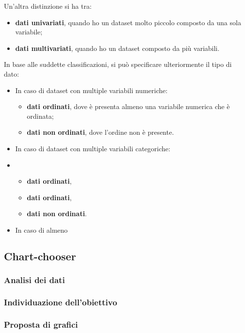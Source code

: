 \bigskip
\noindent Un'altra distinzione si ha tra:
\begin{itemize}
    \item \textbf{dati univariati}, quando ho un dataset molto piccolo composto da una sola variabile;
    \item \textbf{dati multivariati}, quando ho un dataset composto da più variabili.
\end{itemize}

\bigskip
\noindent In base alle suddette classificazioni, si può specificare ulteriormente il tipo di dato:
\begin{itemize}
    \item In caso di dataset con multiple variabili numeriche:
    \begin{itemize}
        \item \textbf{dati ordinati}, dove è presenta almeno una variabile numerica che è ordinata;
        \item \textbf{dati non ordinati}, dove l'ordine non è presente.
    \end{itemize}
    \item In caso di dataset con multiple variabili categoriche:
    \item \begin{itemize}
        \item \textbf{dati ordinati},
        \item \textbf{dati ordinati},
        \item \textbf{dati non ordinati}.
    \end{itemize}
    \item In caso di almeno 
\end{itemize}




\subsection{Chart-chooser}
\subsubsection{Analisi dei dati}
\subsubsection{Individuazione dell'obiettivo}
\subsubsection{Proposta di grafici}






